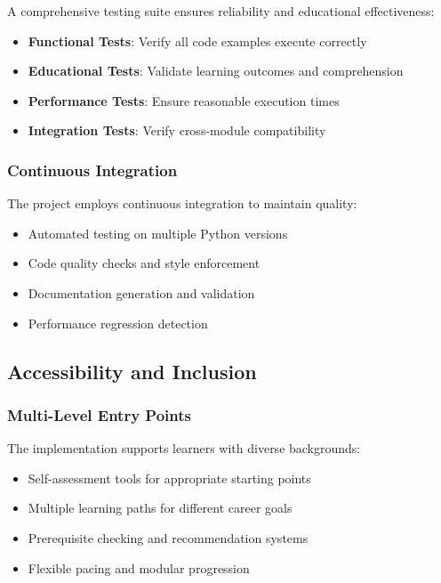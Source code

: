 A comprehensive testing suite ensures reliability and educational effectiveness:

\begin{itemize}
    \item \textbf{Functional Tests}: Verify all code examples execute correctly
    \item \textbf{Educational Tests}: Validate learning outcomes and comprehension
    \item \textbf{Performance Tests}: Ensure reasonable execution times
    \item \textbf{Integration Tests}: Verify cross-module compatibility
\end{itemize}

\subsubsection{Continuous Integration}

The project employs continuous integration to maintain quality:

\begin{itemize}
    \item Automated testing on multiple Python versions
    \item Code quality checks and style enforcement
    \item Documentation generation and validation
    \item Performance regression detection
\end{itemize}

\subsection{Accessibility and Inclusion}

\subsubsection{Multi-Level Entry Points}

The implementation supports learners with diverse backgrounds:

\begin{itemize}
    \item Self-assessment tools for appropriate starting points
    \item Multiple learning paths for different career goals
    \item Prerequisite checking and recommendation systems
    \item Flexible pacing and modular progression
\end{itemize}

